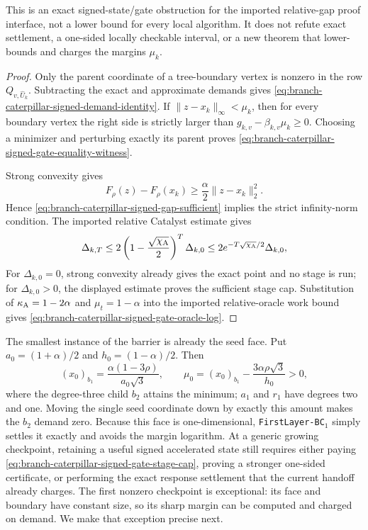 \begin{proposition}
This is an exact signed-state/gate obstruction for the imported
relative-gap proof interface, not a lower bound for every local algorithm.
It does not refute exact settlement, a one-sided locally checkable interval,
or a new theorem that lower-bounds and charges the margins $\mu_k$.
\end{proposition}

\begin{proof}
Only the parent coordinate of a tree-boundary vertex is nonzero in the row
$Q_{v,\widehat U_k}$.  Subtracting the exact and approximate demands gives
\cref{eq:branch-caterpillar-signed-demand-identity}.  If
$\lVert z-x_k\rVert_\infty<\mu_k$, then for every boundary vertex the right
side is strictly larger than
$g_{k,v}-\beta_{k,v}\mu_k\geq0$.  Choosing a minimizer and perturbing exactly
its parent proves
\cref{eq:branch-caterpillar-signed-gate-equality-witness}.

Strong convexity gives
\[
 F_\rho(z)-F_\rho(x_k)
 \geq\frac\alpha2\lVert z-x_k\rVert_2^2.
\]
Hence \cref{eq:branch-caterpillar-signed-gap-sufficient} implies the strict
infinity-norm condition.  The imported relative Catalyst estimate gives
\[
 \Delta_{k,T}
 \leq2\left(1-\frac{\sqrt{\chi_{\rm A}}}{2}\right)^T
       \Delta_{k,0}
 \leq2e^{-T\sqrt{\chi_{\rm A}}/2}\Delta_{k,0},
\]
For $\Delta_{k,0}=0$, strong convexity already gives the exact point and no
stage is run; for $\Delta_{k,0}>0$, the displayed estimate proves the
sufficient stage cap.  Substitution of
$\kappa_{\rm A}=1-2\alpha$ and $\mu_t=1-\alpha$ into the imported
relative-oracle work bound gives
\cref{eq:branch-caterpillar-signed-gate-oracle-log}.
\end{proof}

The smallest instance of the barrier is already the seed face.  Put
$a_0=(1+\alpha)/2$ and $h_0=(1-\alpha)/2$.  Then
\begin{equation}
 (x_0)_{b_1}=\frac{\alpha(1-3\rho)}{a_0\sqrt3},
 \qquad
 \mu_0=(x_0)_{b_1}-\frac{3\alpha\rho\sqrt3}{h_0}>0,
 \label{eq:branch-caterpillar-seed-gate-margin}
\end{equation}
where the degree-three child $b_2$ attains the minimum; $a_1$ and $r_1$ have
degrees two and one.  Moving the single seed coordinate down by exactly this
amount makes the $b_2$ demand zero.  Because this face is one-dimensional,
\texttt{FirstLayer-BC}$_1$ simply settles it exactly and avoids the margin
logarithm.  At a generic growing checkpoint, retaining a useful signed
accelerated state still requires either paying
\cref{eq:branch-caterpillar-signed-gate-stage-cap}, proving a stronger
one-sided certificate, or performing the exact response settlement that the
current handoff already charges.  The first nonzero checkpoint is exceptional:
its face and boundary have constant size, so its sharp margin can be computed
and charged on demand.  We make that exception precise next.
